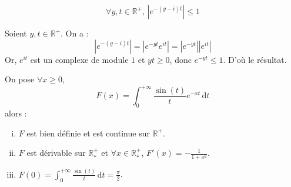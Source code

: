



	
	\begin{lemma}
		\label{integrale-de-dirichlet-1}
		\[ \forall y, t \in \mathbb{R}^+, \, |e^{-(y-i)t}| \leq 1 \]
	\end{lemma}

	\begin{demonstration}
		Soient $y, t \in \mathbb{R}^+$. On a :
		\[ |e^{-(y-i)t}| = |e^{-yt} e^{it}| = |e^{-yt}| |e^{it}| \]
		Or, $e^{it}$ est un complexe de module $1$ et $yt \geq 0$, donc $e^{-yt} \leq 1$. D'où le résultat.
	\end{demonstration}


	\begin{theorem}
		On pose $\forall x \geq 0$,
		\[ F(x) = \int_0^{+\infty} \frac{\sin(t)}{t} e^{-xt} \, \mathrm{d}t \]
		alors :
		\begin{enumerate}[(i)]
			\item $F$ est bien définie et est continue sur $\mathbb{R}^+$.
			\item $F$ est dérivable sur $\mathbb{R}^+_*$ et $\forall x \in \mathbb{R}^+_*$, $F'(x) = -\frac{1}{1+x^2}$.
			\item $F(0) = \int_0^{+\infty} \frac{\sin(t)}{t} \, \mathrm{d}t = \frac{\pi}{2}$.
		\end{enumerate}
	\end{theorem}


